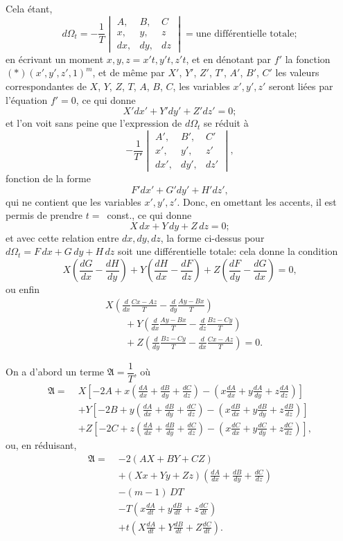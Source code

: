 \documentclass[11pt]{article}
\begin{document}
Cela \'etant,
\[
d\Omega_t = -\frac{1}{T}\begin{vmatrix} A, & B, & C\\ x, & y, & z\\ dx, & dy, & dz \end{vmatrix} = \text{une diff\'erentielle totale};
\]
en \'ecrivant un moment $x, y, z=x't, y't, z't$, et en d\'enotant par $f'$ la fonction $(\ast)(x', y', z', 1)^m$, et de m\^eme par $X'$, $Y'$, $Z'$, $T'$, $A'$, $B'$, $C'$ les valeurs correspondantes de $X$, $Y$, $Z$, $T$, $A$, $B$, $C$, les variables $x', y', z'$ seront li\'ees par l'\'equation $f'=0$, ce qui donne
\[
X'dx' + Y'dy' + Z'dz' = 0;
\]
et l'on voit sans peine que l'expression de $d\Omega_t$ se r\'eduit \`a
\[
-\frac{1}{T'}\begin{vmatrix} A', & B', & C'\\ x', & y', & z'\\ dx', & dy', & dz' \end{vmatrix},
\]
fonction de la forme
\[
F'dx' + G'dy' + H'dz',
\]
qui ne contient que les variables $x', y', z'$. Donc, en omettant les accents, il est permis de prendre $t=$~const., ce qui donne
\[
X\,dx + Y\,dy + Z\,dz = 0;
\]
et avec cette relation entre $dx, dy, dz$, la forme ci-dessus pour $d\Omega_t = F\,dx + G\,dy + H\,dz$ soit une diff\'erentielle totale: cela donne la condition
\[
X\!\left(\frac{dG}{dx}-\frac{dH}{dy}\right) + Y\!\left(\frac{dH}{dx}-\frac{dF}{dz}\right) + Z\!\left(\frac{dF}{dy}-\frac{dG}{dx}\right) = 0,
\]
ou enfin
\begin{align*}
& X\!\left(\frac{d}{dx}\frac{Cx-Az}{T} - \frac{d}{dy}\frac{Ay-Bx}{T}\right)\\
&\qquad + Y\!\left(\frac{d}{dx}\frac{Ay-Bx}{T} - \frac{d}{dz}\frac{Bz-Cy}{T}\right)\\
&\qquad + Z\!\left(\frac{d}{dy}\frac{Bz-Cy}{T} - \frac{d}{dx}\frac{Cx-Az}{T}\right) = 0.
\end{align*}

\medskip

On a d'abord un terme $\mathfrak{A}=\dfrac{1}{T}$, o\`u
\begin{align*}
\mathfrak{A} =\; & X\!\left[-2A+x\!\left(\frac{dA}{dx}+\frac{dB}{dy}+\frac{dC}{dz}\right) - \left(x\frac{dA}{dx}+y\frac{dA}{dy}+z\frac{dA}{dz}\right)\right]\\
& + Y\!\left[-2B+y\!\left(\frac{dA}{dx}+\frac{dB}{dy}+\frac{dC}{dz}\right) - \left(x\frac{dB}{dx}+y\frac{dB}{dy}+z\frac{dB}{dz}\right)\right]\\
& + Z\!\left[-2C+z\!\left(\frac{dA}{dx}+\frac{dB}{dy}+\frac{dC}{dz}\right) - \left(x\frac{dC}{dx}+y\frac{dC}{dy}+z\frac{dC}{dz}\right)\right],
\end{align*}
ou, en r\'eduisant,
\begin{align*}
\mathfrak{A} =\; & -2(AX+BY+CZ)\\
& + (Xx+Yy+Zz)\!\left(\frac{dA}{dx}+\frac{dB}{dy}+\frac{dC}{dz}\right)\\
& - (m-1)\,DT\\
& - T\!\left(x\frac{dA}{dt}+y\frac{dB}{dt}+z\frac{dC}{dt}\right)\\
& + t\!\left(X\frac{dA}{dt}+Y\frac{dB}{dt}+Z\frac{dC}{dt}\right).
\end{align*}
\end{document}

